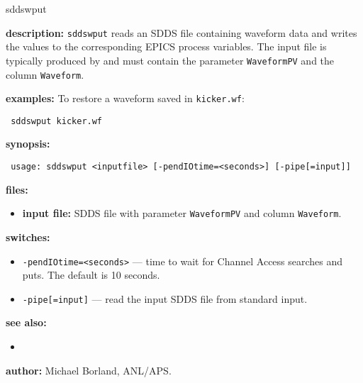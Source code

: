 \begin{sddsprog}{sddswput}
\item \textbf{description:}
  \verb+sddswput+ reads an SDDS file containing waveform data and writes the
  values to the corresponding EPICS process variables.  The input file is
  typically produced by  and must contain the parameter
  \verb|WaveformPV| and the column \verb|Waveform|.

\item \textbf{examples:}
  To restore a waveform saved in \verb|kicker.wf|:
  \begin{flushleft}{\tt
  sddswput kicker.wf
  }\end{flushleft}

\item \textbf{synopsis:}
  \begin{flushleft}{\tt
usage: sddswput <inputfile>\
      [-pendIOtime=<seconds>] [-pipe[=input]]
  }\end{flushleft}

\item \textbf{files:}
\begin{itemize}
  \item \textbf{input file:} SDDS file with parameter \verb|WaveformPV| and column \verb|Waveform|.
\end{itemize}

\item \textbf{switches:}
\begin{itemize}
  \item {\tt -pendIOtime=<seconds>} --- time to wait for Channel Access searches and puts. The default is 10 seconds.
  \item {\tt -pipe[=input]} --- read the input SDDS file from standard input.
\end{itemize}

\item \textbf{see also:}
\begin{itemize}
  \item {}
\end{itemize}

\item \textbf{author:} Michael Borland, ANL/APS.
\end{sddsprog}
